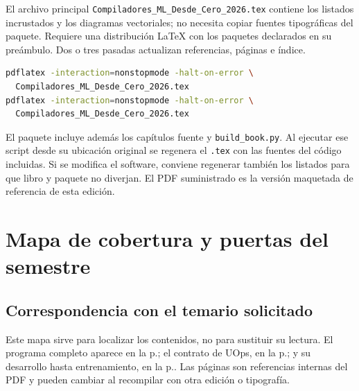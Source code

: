 El archivo principal \texttt{Compiladores\_ML\_Desde\_Cero\_2026.tex} contiene los listados incrustados y los diagramas vectoriales; no necesita copiar fuentes tipográficas del paquete. Requiere una distribución LaTeX con los paquetes declarados en su preámbulo. Dos o tres pasadas actualizan referencias, páginas e índice.

\begin{lstlisting}[language=bash]
pdflatex -interaction=nonstopmode -halt-on-error \
  Compiladores_ML_Desde_Cero_2026.tex
pdflatex -interaction=nonstopmode -halt-on-error \
  Compiladores_ML_Desde_Cero_2026.tex
\end{lstlisting}

El paquete incluye además los capítulos fuente y \texttt{build\_book.py}. Al ejecutar ese script desde su ubicación original se regenera el \texttt{.tex} con las fuentes del código incluidas. Si se modifica el software, conviene regenerar también los listados para que libro y paquete no diverjan. El PDF suministrado es la versión maquetada de referencia de esta edición.

\chapter{Mapa de cobertura y puertas del semestre}\label{app:cobertura}

\section{Correspondencia con el temario solicitado}
Este mapa sirve para localizar los contenidos, no para sustituir su lectura. El programa completo aparece en la p.\pageref{curso:programa}; el contrato de UOps, en la p.\pageref{curso:contrato}; y su desarrollo hasta entrenamiento, en la p.\pageref{curso:rangeify}. Las páginas son referencias internas del PDF y pueden cambiar al recompilar con otra edición o tipografía.


